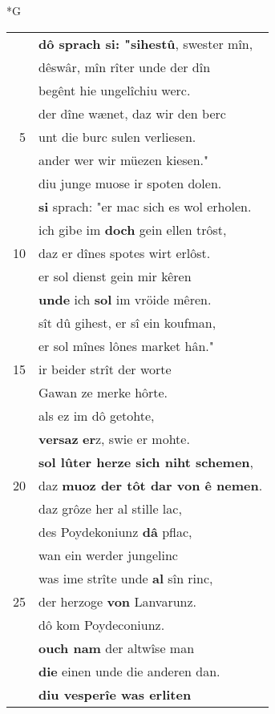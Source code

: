 \documentclass[8pt,a4paper,notitlepage]{article}
\begin{document}
\newpage
\begin{table}[ht]
\begin{minipage}[t]{0.5\linewidth}
\small
\begin{center}*G
\end{center}
\begin{tabular}{rl}
 & \textbf{dô sprach si: "sihestû}, swester mîn,\\ 
 & dêswâr, mîn rîter unde der dîn\\ 
 & begênt hie ungelîchiu werc.\\ 
 & der dîne wænet, daz wir den berc\\ 
5 & unt die burc sulen verliesen.\\ 
 & ander wer wir müezen kiesen."\\ 
 & diu junge muose ir spoten dolen.\\ 
 & \textbf{si} sprach: "er mac sich es wol erholen.\\ 
 & ich gibe im \textbf{doch} gein ellen trôst,\\ 
10 & daz er dînes spotes wirt erlôst.\\ 
 & er sol dienst gein mir kêren\\ 
 & \textbf{unde} ich \textbf{sol} im vröide mêren.\\ 
 & sît dû gihest, er sî ein koufman,\\ 
 & er sol mînes lônes market hân."\\ 
15 & ir beider strît der worte\\ 
 & Gawan ze merke hôrte.\\ 
 & als ez im dô getohte,\\ 
 & \textbf{versaz} \textbf{er}z, swie er mohte.\\ 
 & \textbf{sol lûter herze sich niht schemen},\\ 
20 & daz \textbf{muoz der tôt dar von ê nemen}.\\ 
 & daz grôze her al stille lac,\\ 
 & des Poydekoniunz \textbf{dâ} pflac,\\ 
 & wan ein werder jungelinc\\ 
 & was ime strîte unde \textbf{al} sîn rinc,\\ 
25 & der herzoge \textbf{von} Lanvarunz.\\ 
 & dô kom Poydeconiunz.\\ 
 & \textbf{ouch nam} der altwîse man\\ 
 & \textbf{die} einen unde die anderen dan.\\ 
 & \textbf{diu vesperîe was erliten}\\ 

\end{tabular}
\end{minipage}
\end{table}
\end{document}

